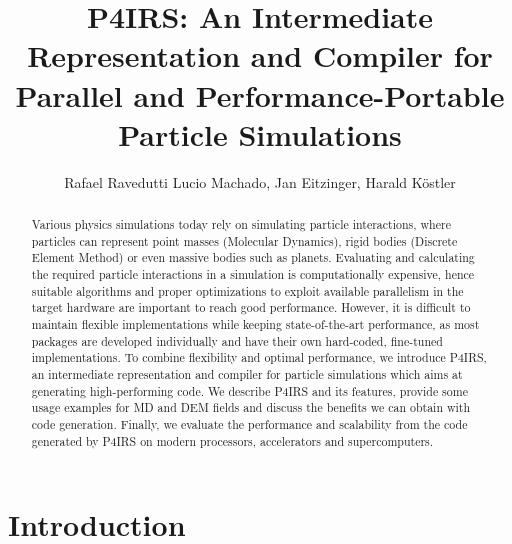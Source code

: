 \documentclass[Afour,sageh,times]{sagej}
\begin{document}

\title{P4IRS: An Intermediate Representation and Compiler for Parallel and Performance-Portable Particle Simulations}

\author{Rafael Ravedutti Lucio Machado, Jan Eitzinger, Harald Köstler}


\begin{abstract}
Various physics simulations today rely on simulating particle interactions, where particles can represent point masses (Molecular Dynamics), rigid bodies (Discrete Element Method) or even massive bodies such as planets.
Evaluating and calculating the required particle interactions in a simulation is computationally expensive, hence suitable algorithms and proper optimizations to exploit available parallelism in the target hardware are important to reach good performance.
However, it is difficult to maintain flexible implementations while keeping state-of-the-art performance, as most packages are developed individually and have their own hard-coded, fine-tuned implementations.
To combine flexibility and optimal performance, we introduce P4IRS, an intermediate representation and compiler for particle simulations which aims at generating high-performing code.
We describe P4IRS and its features, provide some usage examples for MD and DEM fields and discuss the benefits we can obtain with code generation.
Finally, we evaluate the performance and scalability from the code generated by P4IRS on modern processors, accelerators and supercomputers.
\end{abstract}


\maketitle

\section{Introduction}
\end{document}
